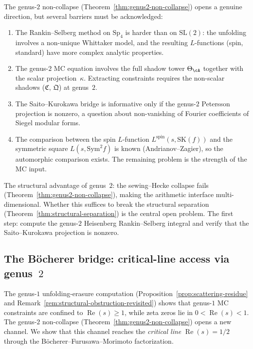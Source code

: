 \begin{remark}%
\label{rem:genus2-arithmetic-frontier}%
%
The genus-$2$ non-collapse
(Theorem~\ref{thm:genus2-non-collapse}) opens a genuine
direction, but several barriers must be acknowledged:
\begin{enumerate}[label=\textup{(\roman*)}]
\item The Rankin--Selberg method on $\mathrm{Sp}_4$ is
 harder than on $\mathrm{SL}(2)$: the unfolding involves
 a non-unique Whittaker model, and the resulting
 $L$-functions (spin, standard) have more complex analytic
 properties.
\item The genus-$2$ MC equation involves the full shadow
tower $\Theta_\cA$ together with the scalar
projection~$\kappa$. Extracting constraints requires
 the non-scalar shadows ($\mathfrak{C}$, $\mathfrak{Q}$)
 at genus~$2$.
\item The Saito--Kurokawa bridge is informative only if
 the genus-$2$ Petersson projection is nonzero, a question
 about non-vanishing of Fourier coefficients of Siegel
 modular forms.
\item The comparison between the spin $L$-function
 $L^{\mathrm{spin}}(s, \mathrm{SK}(f))$ and the symmetric
 square $L(s, \mathrm{Sym}^2 f)$ is known
 (Andrianov--Zagier), so the automorphic comparison exists.
 The remaining problem is the strength of the MC input.
\end{enumerate}
The structural advantage of genus~$2$: the
sewing--Hecke collapse fails
(Theorem~\ref{thm:genus2-non-collapse}), making the arithmetic
interface multi-dimensional. Whether this
suffices to break the structural separation
(Theorem~\ref{thm:structural-separation}) is the central open
problem. The first step: compute the
genus-$2$ Heisenberg Rankin--Selberg integral and
verify that the Saito--Kurokawa projection is nonzero.
\end{remark}

\subsection{The B\"ocherer bridge: critical-line access via genus~$2$}%
\label{subsec:bocherer-bridge-theorem}%
%
%

The genus-$1$ unfolding-erasure computation
(Proposition~\ref{prop:scattering-residue} and
Remark~\ref{rem:structural-obstruction-revisited})
shows that genus-$1$ MC constraints are confined to
$\operatorname{Re}(s) \geq 1$, while zeta zeros lie in
$0 < \operatorname{Re}(s) < 1$.
The genus-$2$ non-collapse (Theorem~\ref{thm:genus2-non-collapse})
opens a new channel. We show that this channel reaches the
\emph{critical line} $\operatorname{Re}(s) = 1/2$ through the
B\"ocherer--Furusawa--Morimoto factorization.

